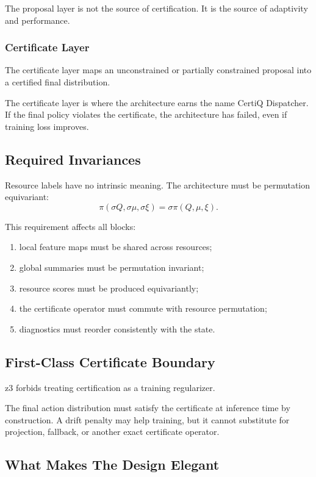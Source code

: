 \documentclass[a4paper,11pt]{article}
\theoremstyle{definition}
\begin{document}
The proposal layer is not the source of certification. It is the source of
adaptivity and performance.

\subsubsection{Certificate Layer}

The certificate layer maps an unconstrained or partially constrained proposal
into a certified final distribution.

The certificate layer is where the architecture earns the name CertiQ
Dispatcher. If the final policy violates the certificate, the architecture has
failed, even if training loss improves.

\subsection{Required Invariances}

Resource labels have no intrinsic meaning. The architecture must be
permutation equivariant:
\[
\pi(\sigma Q,\sigma\mu,\sigma\xi)=\sigma\pi(Q,\mu,\xi).
\]

This requirement affects all blocks:
\begin{enumerate}
  \item local feature maps must be shared across resources;
  \item global summaries must be permutation invariant;
  \item resource scores must be produced equivariantly;
  \item the certificate operator must commute with resource permutation;
  \item diagnostics must reorder consistently with the state.
\end{enumerate}

\subsection{First-Class Certificate Boundary}

z3 forbids treating certification as a training regularizer.

The final action distribution must satisfy the certificate at inference time by
construction. A drift penalty may help training, but it cannot substitute for
projection, fallback, or another exact certificate operator.

\subsection{What Makes The Design Elegant}
\end{document}
